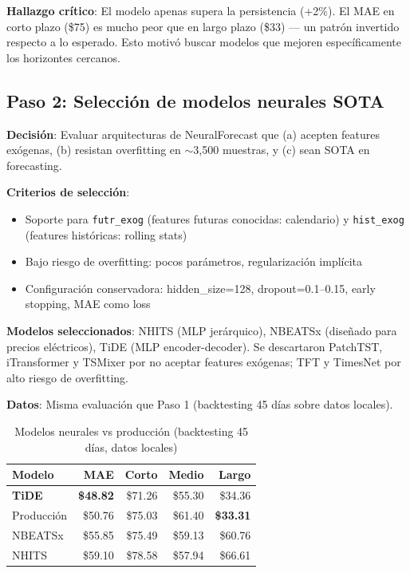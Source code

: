\documentclass[11pt,a4paper]{article}
\begin{document}
\textbf{Hallazgo cr\'itico}: El modelo apenas supera la persistencia (+2\%). El MAE en corto plazo (\$75) es mucho peor que en largo plazo (\$33) --- un patr\'on invertido respecto a lo esperado. Esto motiv\'o buscar modelos que mejoren espec\'ificamente los horizontes cercanos.

\subsection{Paso 2: Selecci\'on de modelos neurales SOTA}

\textbf{Decisi\'on}: Evaluar arquitecturas de NeuralForecast que (a) acepten features ex\'ogenas, (b) resistan overfitting en $\sim$3,500 muestras, y (c) sean SOTA en forecasting.

\textbf{Criterios de selecci\'on}:
\begin{itemize}
    \item Soporte para \texttt{futr\_exog} (features futuras conocidas: calendario) y \texttt{hist\_exog} (features hist\'oricas: rolling stats)
    \item Bajo riesgo de overfitting: pocos par\'ametros, regularizaci\'on impl\'icita
    \item Configuraci\'on conservadora: hidden\_size=128, dropout=0.1--0.15, early stopping, MAE como loss
\end{itemize}

\textbf{Modelos seleccionados}: NHITS (MLP jer\'arquico), NBEATSx (dise\~nado para precios el\'ectricos), TiDE (MLP encoder-decoder). Se descartaron PatchTST, iTransformer y TSMixer por no aceptar features ex\'ogenas; TFT y TimesNet por alto riesgo de overfitting.

\textbf{Datos}: Misma evaluaci\'on que Paso 1 (backtesting 45 d\'ias sobre datos locales).

\begin{table}[H]
\centering
\caption{Modelos neurales vs producci\'on (backtesting 45 d\'ias, datos locales)}
\label{tab:neural}
\begin{tabular}{lrrrr}
\toprule
\textbf{Modelo} & \textbf{MAE} & \textbf{Corto} & \textbf{Medio} & \textbf{Largo} \\
\midrule
\textcolor{mejora}{\textbf{TiDE}} & \textcolor{mejora}{\textbf{\$48.82}} & \$71.26 & \$55.30 & \$34.36 \\
Producci\'on & \$50.76 & \$75.03 & \$61.40 & \textbf{\$33.31} \\
NBEATSx & \$55.85 & \$75.49 & \$59.13 & \$60.76 \\
NHITS & \$59.10 & \$78.58 & \$57.94 & \$66.61 \\
\bottomrule
\end{tabular}
\end{table}
\end{document}
